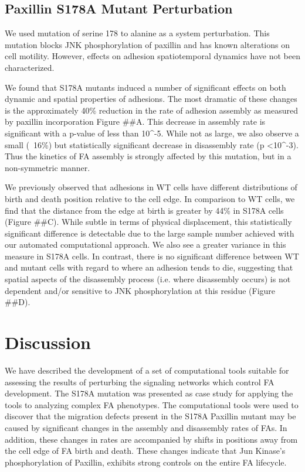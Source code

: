 \documentclass[10pt]{article}
\begin{document}
\subsection*{Paxillin S178A Mutant Perturbation}
We used mutation of serine 178 to alanine as a system perturbation. This mutation blocks JNK phosphorylation of paxillin and has known alterations on cell motility. However, effects on adhesion spatiotemporal dynamics have not been characterized.

We found that S178A mutants induced a number of significant effects on both dynamic and spatial properties of adhesions. The most dramatic of these changes is the approximately 40\% reduction in the rate of adhesion assembly as measured by paxillin incorporation Figure ##A. This decrease in assembly rate is significant with a p-value of less than 10^-5. While not as large, we also observe a small (~16\%) but statistically significant decrease in disassembly rate (p <10^-3). Thus the kinetics of FA assembly is strongly affected by this mutation, but in a non-symmetric manner.

We previously observed that adhesions in  WT cells have different distributions of birth and death position relative to the cell edge. In comparison to WT cells, we find that the distance from the edge at birth is greater by 44\% in S178A cells (Figure ##C). While subtle in terms of physical displacement, this statistically significant difference is detectable due to the large sample number achieved with our automated computational approach. We also see a greater variance in this measure in S178A cells. In contrast, there is no significant difference between WT and mutant cells with regard to where an adhesion tends to die, suggesting that spatial aspects of the disassembly process (i.e. where disassembly occurs) is not dependent and/or sensitive to JNK phosphorylation at this residue (Figure ##D).



\section*{Discussion}

We have described the development of a set of computational tools suitable for
assessing the results of perturbing the signaling networks which control FA
development. The S178A mutation was presented as case study for applying the
tools to analyzing complex FA phenotypes. The computational tools were used to
discover that the migration defects present in the S178A Paxillin mutant may be
caused by significant changes in the assembly and disassembly rates of FAs. In
addition, these changes in rates are accompanied by shifts in positions away
from the cell edge of FA birth and death. These changes indicate that Jun
Kinase's phosphorylation of Paxillin, exhibits strong controls on the entire FA
lifecycle.
\end{document}
